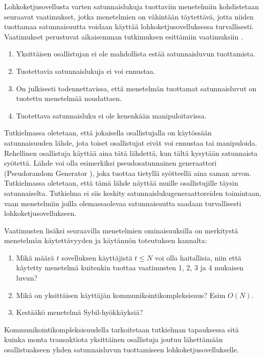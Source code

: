 Lohkoketjusovellusta varten satunnaislukuja tuottaviin menetelmiin kohdistetaan seuraavat vaatimukset, jotka menetelmien on vähintään täytettävä, jotta niiden tuottamaa satunnaisuutta voidaan käyttää lohkoketjusovelluksessa turvallisesti. Vaatimukset perustuvat aikaisemman tutkimuksen esittämiin vaatimuksiin \cite{cherniaeva2019homomorphic, schindler_hydrand_2020, syta_scalable_2017}. 

\begin{enumerate}
    \item Yksittäisen osallistujan ei ole mahdollista estää satunnaisluvun tuottamista.
    \item Tuotettavia satunnaislukuja ei voi ennustaa.
    \item On julkisesti todennettavissa, että menetelmän tuottamat satunnaisluvut on tuotettu menetelmää noudattaen.
    \item Tuotettava satunnaisluku ei ole kenenkään manipuloitavissa.
\end{enumerate}

Tutkielmassa oletetaan, että jokaisella osallistujalla on käytössään satunnaisuuden lähde, jota toiset osallistujat eivät voi ennustaa tai manipuloida. Rehellinen osallistuja käyttää aina tätä lähdettä, kun tältä kysytään satunnaista syötettä. Lähde voi olla esimerkiksi pseudosatunnainen generaattori (Pseudorandom Generator \cite{alma9932206893506253}), joka tuottaa tietyllä syötteellä aina saman arvon. Tutkielmassa oletetaan, että tämä lähde näyttää muille osallistujille täysin satunnaiselta. Tutkielma ei siis keskity satunnaislukugeneraattoreiden toimintaan, vaan menetelmiin joilla olemassaolevaa satunnaisuutta saadaan turvallisesti lohkoketjusovellukseen. 

Vaatimusten lisäksi seuraavilla menetelmien ominaisuuksilla on merkitystä menetelmän käytettävyyden ja käytännön toteutuksen kannalta:

\begin{enumerate}
    \item Mikä määrä $t$ sovelluksen käyttäjistä $t \leq N$ voi olla haitallisia, niin että käytetty menetelmä kuitenkin tuottaa vaatimusten 1, 2, 3 ja 4 mukaisen luvun?
    \item Mikä on yksittäisen käyttäjän kommunikointikompleksisuus? Esim $O(N)$.
    \item Kestääkö menetelmä Sybil-hyökkäyksiä?
\end{enumerate}

Kommunikointikompleksisuudella tarkoitetaan tutkielman tapauksessa sitä kuinka monta transaktiota yksittäinen osallistuja joutuu lähettämään osallistuakseen yhden satunnaisluvun tuottamiseen lohkoketjusovellukselle. 

